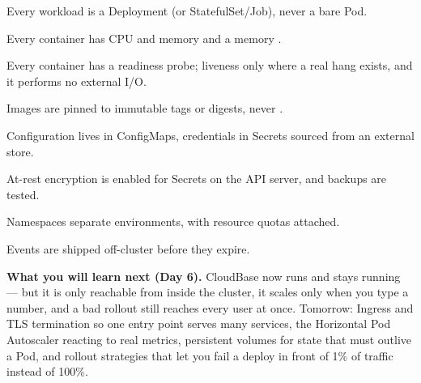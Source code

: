 \begin{checklist}
  \item Every workload is a Deployment (or StatefulSet/Job), never a bare Pod.
  \item Every container has CPU and memory  and a memory .
  \item Every container has a readiness probe; liveness only where a real hang exists, and it performs no external I/O.
  \item Images are pinned to immutable tags or digests, never .
  \item Configuration lives in ConfigMaps, credentials in Secrets sourced from an external store.
  \item At-rest encryption is enabled for Secrets on the API server, and  backups are tested.
  \item Namespaces separate environments, with resource quotas attached.
  \item Events are shipped off-cluster before they expire.
\end{checklist}

\begin{keyidea}
\textbf{What you will learn next (Day 6).} CloudBase now runs and stays running --- but it is only reachable from inside the cluster, it scales only when you type a number, and a bad rollout still reaches every user at once. Tomorrow: Ingress and TLS termination so one entry point serves many services, the Horizontal Pod Autoscaler reacting to real metrics, persistent volumes for state that must outlive a Pod, and rollout strategies that let you fail a deploy in front of 1\% of traffic instead of 100\%.
\end{keyidea}
